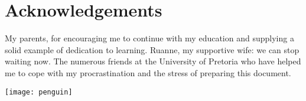\chapter*{Acknowledgements}

My parents, for encouraging me to continue with my education and
supplying a solid example of dedication to learning.  Ruanne, my
supportive wife: we can stop waiting now.  The numerous friends at the
University of Pretoria who have helped me to cope with my
procrastination and the stress of preparing this document.

\vfil

\begin{flushright}
  \texttt{[image: penguin]} 
\end{flushright}

